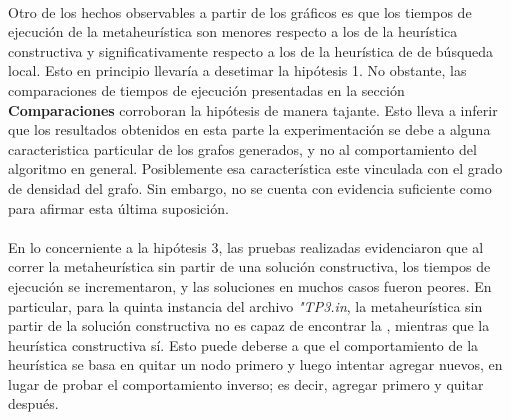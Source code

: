 \paragraph{}
Otro de los hechos observables a partir de los gráficos es que los tiempos de ejecución de la metaheurística son menores respecto a los de la heurística constructiva y significativamente respecto a los de la heurística de de búsqueda local. Esto en principio llevaría a desetimar la hipótesis 1. No obstante, las comparaciones de tiempos de ejecución presentadas en la sección \textbf{Comparaciones} corroboran la hipótesis de manera tajante. Esto lleva a inferir que los resultados obtenidos en esta parte la experimentación se debe a alguna caracteristica particular de los grafos generados, y no al comportamiento del algoritmo en general. Posiblemente esa característica este vinculada con el grado de densidad del grafo. Sin embargo, no se cuenta con evidencia suficiente como para afirmar esta última suposición.

\paragraph{}
En lo concerniente a la hipótesis 3, las pruebas realizadas evidenciaron que al correr la metaheurística sin partir de una solución constructiva, los tiempos de ejecución se incrementaron, y las soluciones en muchos casos fueron peores. En particular, para la quinta instancia del archivo \textit{"TP3.in}, la metaheurística sin partir de la solución constructiva no es capaz de encontrar la \mc, mientras que la heurística constructiva sí. Esto puede deberse a que el comportamiento de la heurística se basa en quitar un nodo primero y luego intentar agregar nuevos, en lugar de probar el comportamiento inverso; es decir, agregar primero y quitar después.

\paragraph{}

